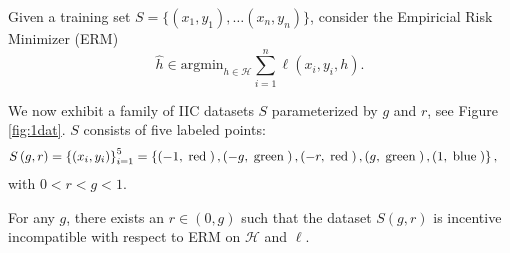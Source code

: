\documentclass{article}
\def\H{\mathcal H}
\def\argmin{\mathrm{argmin}}
\begin{document}
 Given a training set $S=\{(x_1,y_1), \ldots (x_n, y_n)\}$, consider the Empiricial Risk Minimizer (ERM)
 \begin{equation}
 \hat h \in \argmin_{h \in \H} \sum_{i=1}^n \ell(x_i, y_i, h).
 \end{equation}

We now exhibit a family of IIC datasets $S $ parameterized by $g $ and $r $, see Figure \ref{fig:1dat}. $S $ consists of five labeled points:
\begin{align*}
S\left(g, r\right)  &= \left\{\left(x_{i}, y_{i}\right)\right\}_{i=1}^{5} = \left\{\left(-1, \text{\;red\;}\right), \left(-g, \text{\;green\;}\right), \left(-r, \text{\;red\;}\right), \left(g, \text{\;green\;}\right), \left(1, \text{\;blue\;}\right)\right\},
\end{align*}
with $0 < r < g < 1$.
\newline \newline
\begin{prop} \label{prop:ex1} 
For any $g $, there exists an $r  \in \left(0, g\right)$ such that the dataset $S\left(g, r \right) $ is incentive incompatible with respect to ERM on $\mathcal{H}$ and $\ell$.
\end{prop}
\end{document}
